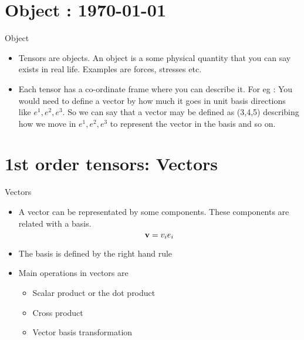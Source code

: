 




	\tableofcontents
	
\section{Object : \today}

	\begin{frame}{Object}
		\begin{itemize}
			
			\item Tensors are objects. An object is a some physical quantity that you can say exists in real life. Examples are forces, stresses etc.
			
			\item Each tensor has a co-ordinate frame where you can describe it. For eg : You would need to define a vector by how much it goes in unit basis directions like $e^1, e^2, e^3$. So we can say that a vector may be defined as (3,4,5) describing how we move in $e^1, e^2, e^3$ to represent the vector in the basis and so on. 
		\end{itemize}
	\end{frame}

	

\section{1st order tensors: Vectors}
	\begin{frame}{Vectors}
		\begin{itemize}
			\item A vector can be representated by some components. These components are related with a basis.
			\begin{equation}
			   \mathbf{v} = v_i e_i 
			\end{equation}
			\item The basis is defined by the right hand rule
			\item  Main operations in vectors are 
				\begin{itemize}
					\item Scalar product or the dot product
					\item Cross product
					\item Vector basis transformation
					
				\end{itemize}
		\end{itemize}
	\end{frame}


